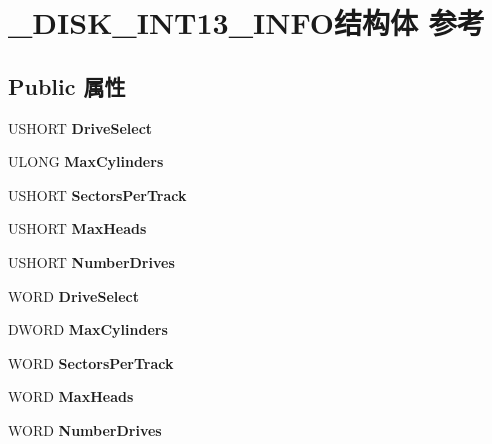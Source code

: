 \hypertarget{struct___d_i_s_k___i_n_t13___i_n_f_o}{}\section{\+\_\+\+D\+I\+S\+K\+\_\+\+I\+N\+T13\+\_\+\+I\+N\+F\+O结构体 参考}
\label{struct___d_i_s_k___i_n_t13___i_n_f_o}
\subsection*{Public 属性}
\begin{DoxyCompactItemize}
\item 
\mbox{\label{struct___d_i_s_k___i_n_t13___i_n_f_o_a98d60e1ed125a2becb0b78c974c858f3}} 
U\+S\+H\+O\+RT {\bfseries Drive\+Select}
\item 
\mbox{\label{struct___d_i_s_k___i_n_t13___i_n_f_o_a889c17f9b1f8f29501c7c70d4ccd6aee}} 
U\+L\+O\+NG {\bfseries Max\+Cylinders}
\item 
\mbox{\label{struct___d_i_s_k___i_n_t13___i_n_f_o_a9717fc45c353bccddd969ec7e0adbcf7}} 
U\+S\+H\+O\+RT {\bfseries Sectors\+Per\+Track}
\item 
\mbox{\label{struct___d_i_s_k___i_n_t13___i_n_f_o_a20cb5445fb0ff731c61aac40927019db}} 
U\+S\+H\+O\+RT {\bfseries Max\+Heads}
\item 
\mbox{\label{struct___d_i_s_k___i_n_t13___i_n_f_o_abf7f6b4fd83b9a6d5e4625f406e243a2}} 
U\+S\+H\+O\+RT {\bfseries Number\+Drives}
\item 
\mbox{\label{struct___d_i_s_k___i_n_t13___i_n_f_o_afa838c8489bf64cc69bff8d26c31e95b}} 
W\+O\+RD {\bfseries Drive\+Select}
\item 
\mbox{\label{struct___d_i_s_k___i_n_t13___i_n_f_o_a2d2422dc528a589238a578fa7156da76}} 
D\+W\+O\+RD {\bfseries Max\+Cylinders}
\item 
\mbox{\label{struct___d_i_s_k___i_n_t13___i_n_f_o_a8fe9648717d044932f2b7da9f5aef9ab}} 
W\+O\+RD {\bfseries Sectors\+Per\+Track}
\item 
\mbox{\label{struct___d_i_s_k___i_n_t13___i_n_f_o_adebcfc28cc51a33a5fab630f0dd221fe}} 
W\+O\+RD {\bfseries Max\+Heads}
\item 
\mbox{\label{struct___d_i_s_k___i_n_t13___i_n_f_o_aa86f70c945e097457ba97b346bb15419}} 
W\+O\+RD {\bfseries Number\+Drives}
\end{DoxyCompactItemize}


